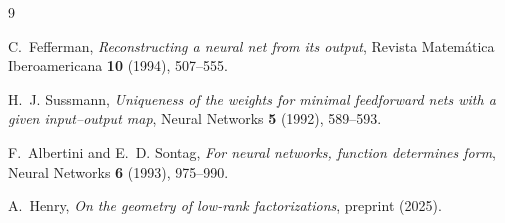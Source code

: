 \documentclass[11pt]{article}
\theoremstyle{definition}
\theoremstyle{remark}
\theoremstyle{plain}
\begin{document}
\begin{thebibliography}{9}

C.~Fefferman,
\emph{Reconstructing a neural net from its output},
Revista Matem\'atica Iberoamericana \textbf{10} (1994), 507--555.

H.~J. Sussmann,
\emph{Uniqueness of the weights for minimal feedforward nets with a given
input--output map},
Neural Networks \textbf{5} (1992), 589--593.

F.~Albertini and E.~D. Sontag,
\emph{For neural networks, function determines form},
Neural Networks \textbf{6} (1993), 975--990.

A.~Henry,
\emph{On the geometry of low-rank factorizations},
preprint (2025).

\end{thebibliography}
\end{document}
